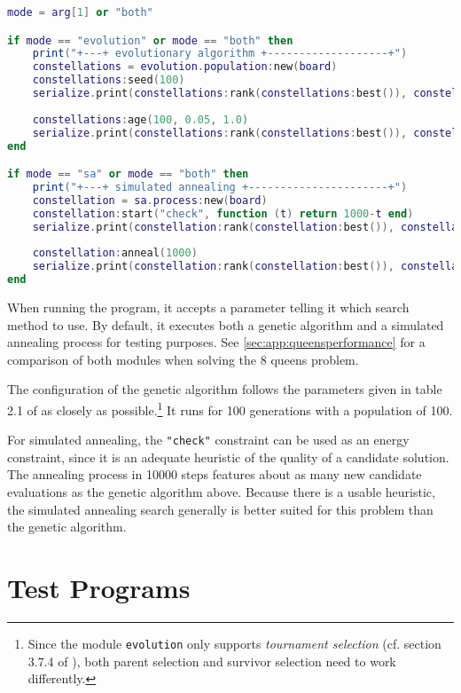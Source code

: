 \begin{appendices}
\begin{lstlisting}[language=lua, caption={The script \texttt{queens} (part 2, continued from listing \ref{lst:queens1})}, label=lst:queens2, name=lst:queens]
mode = arg[1] or "both"

if mode == "evolution" or mode == "both" then
    print("+---+ evolutionary algorithm +-------------------+")
    constellations = evolution.population:new(board)
    constellations:seed(100)
    serialize.print(constellations:rank(constellations:best()), constellations:best():gettraits())
    
    constellations:age(100, 0.05, 1.0)
    serialize.print(constellations:rank(constellations:best()), constellations:best():gettraits())
end

if mode == "sa" or mode == "both" then
    print("+---+ simulated annealing +----------------------+")
    constellation = sa.process:new(board)
    constellation:start("check", function (t) return 1000-t end)
    serialize.print(constellation:rank(constellation:best()), constellation:best())
    
    constellation:anneal(1000)
    serialize.print(constellation:rank(constellation:best()), constellation:best())
end\end{lstlisting}

When running the program, it accepts a parameter telling it which search method to use. By default, it executes both a genetic algorithm and a simulated annealing process for testing purposes. See \ref{sec:app:queensperformance} for a comparison of both modules when solving the 8 queens problem.

The configuration of the genetic algorithm follows the parameters given in table 2.1 of \cite{EibenSmith2007} as closely as possible.\footnote{Since the module \texttt{evolution} only supports \emph{tournament selection} (cf. section 3.7.4 of \cite{EibenSmith2007}), both parent selection and survivor selection need to work differently.} It runs for 100 generations with a population of 100.

For simulated annealing, the \texttt{"check"} constraint can be used as an energy constraint, since it is an adequate heuristic of the quality of a candidate solution. The annealing process in 10000 steps features about as many new candidate evaluations as the genetic algorithm above. Because there is a usable heuristic, the simulated annealing search generally is better suited for this problem than the genetic algorithm.


\chapter{Test Programs}


\end{appendices}
